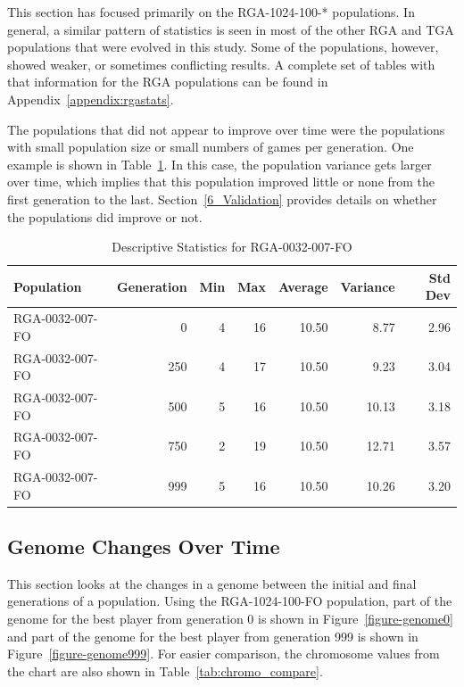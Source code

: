 This section has focused primarily on the RGA-1024-100-* populations. In
general, a similar pattern of statistics is seen in most of the other RGA and
TGA populations that were evolved in this study. Some of the populations,
however, showed weaker, or sometimes conflicting results. A complete set of
tables with that information for the RGA populations can be found in
Appendix~\ref{appendix:rgastats}.

The populations that did not appear to improve over time were the populations
with small population size or small numbers of games per generation. One example
is shown in Table~\ref{tab:6_RGA-0032-007-FO}. In this case, the population
variance gets larger over time, which implies that this population improved
little or none from the first generation to the last. Section~\ref{6_Validation}
provides details on whether the populations did improve or not.

\begin{table}[htbp]
  \centering
  \caption[RGA-0032-007-FO Statistics]{Descriptive Statistics for RGA-0032-007-FO}
    \begin{tabular}{lrrrrrr}
    \toprule
    Population &  Generation & Min    & Max    & Average & Variance & Std Dev \\
    \midrule
    RGA-0032-007-FO & 0      & 4      & 16     & 10.50  & 8.77   & 2.96 \\
    RGA-0032-007-FO & 250    & 4      & 17     & 10.50  & 9.23   & 3.04 \\
    RGA-0032-007-FO & 500    & 5      & 16     & 10.50  & 10.13  & 3.18 \\
    RGA-0032-007-FO & 750    & 2      & 19     & 10.50  & 12.71  & 3.57 \\
    RGA-0032-007-FO & 999    & 5      & 16     & 10.50  & 10.26  & 3.20 \\
    \bottomrule
    \end{tabular}
  \label{tab:6_RGA-0032-007-FO}%
\end{table}%

\subsection{Genome Changes Over Time} \label{6_genomeChanges}

This section looks at the changes in a genome between the initial and final
generations of a population. Using the RGA-1024-100-FO population, part of
the genome for the best player from generation 0 is shown in
Figure~\ref{figure-genome0} and part of the genome for the best player from
generation 999 is shown in Figure~\ref{figure-genome999}. For easier comparison,
the chromosome values from the chart are also shown in
Table~\ref{tab:chromo_compare}.

